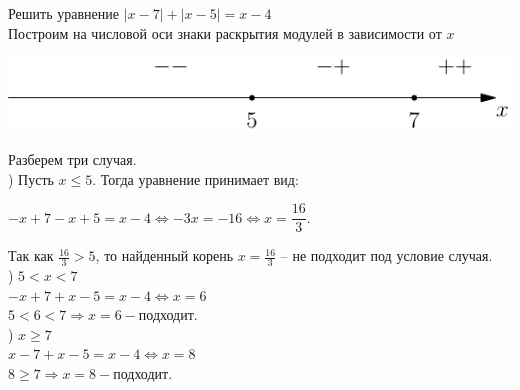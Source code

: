  Решить уравнение $|x-7|+|x-5|=x-4$\\
Построим на числовой оси знаки раскрытия модулей в зависимости от $x$\\
\begin{center}
\includegraphics[scale =1]{7.pdf}\\
\end{center}
Разберем три случая.\\
) Пусть $x\leqslant5$. Тогда уравнение принимает вид:
\begin{center}
$-x+7-x+5=x-4 \Leftrightarrow -3x=-16\Leftrightarrow x=\dfrac{16}3.$\\
\end{center}
Так как $\frac{16}3>5$, то найденный корень $x=\frac{16}3$ -- не подходит под условие случая.\\[0.3cm]
) $5<x<7$\\
$-x+7+x-5=x-4 \Leftrightarrow x=6$\\
$5<6<7 \Rightarrow x=6 - \text{подходит.}$\\[0.3cm]
) $x\geqslant 7$\\
$x-7+x-5=x-4 \Leftrightarrow x=8$\\
$8\geqslant7 \Rightarrow x=8 - \text{подходит.}$\\

